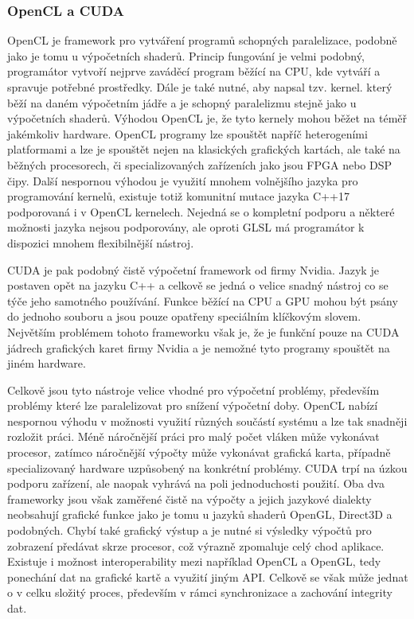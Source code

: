 \subsubsection{OpenCL a CUDA}
OpenCL je framework pro vytváření programů schopných paralelizace, podobně jako je tomu u výpočetních shaderů. Princip fungování je velmi podobný, programátor vytvoří nejprve zaváděcí program běžící na CPU, kde vytváří a spravuje potřebné prostředky. Dále je také nutné, aby napsal tzv. kernel. který běží na daném výpočetním jádře a je schopný paralelizmu stejně jako u výpočetních shaderů. Výhodou OpenCL je, že tyto kernely mohou běžet na téměř jakémkoliv hardware. OpenCL programy lze spouštět napříč heterogeními platformami a lze je spouštět nejen na klasických grafických kartách, ale také na běžných procesorech, či specializovaných zařízeních jako jsou FPGA nebo DSP čipy. Další nespornou výhodou je využití mnohem volnějšího jazyka pro programování kernelů, existuje totiž komunitní mutace jazyka C++17 podporovaná i v OpenCL kernelech. Nejedná se o kompletní podporu a některé možnosti jazyka nejsou podporovány, ale oproti GLSL má programátor k dispozici mnohem flexibilnější nástroj. 

CUDA je pak podobný čistě výpočetní framework od firmy Nvidia. Jazyk je postaven opět na jazyku C++ a celkově se jedná o velice snadný nástroj co se týče jeho samotného používání. Funkce běžící na CPU a GPU mohou být psány do jednoho souboru a jsou pouze opatřeny speciálním klíčkovým slovem. Největším problémem tohoto frameworku však je, že je funkční pouze na CUDA jádrech grafických karet firmy Nvidia a je nemožné tyto programy spouštět na jiném hardware.

Celkově jsou tyto nástroje velice vhodné pro výpočetní problémy, především problémy které lze paralelizovat pro snížení výpočetní doby. OpenCL nabízí nespornou výhodu v možnosti využití různých součástí systému a lze tak snadněji rozložit práci. Méně náročnější práci pro malý počet vláken může vykonávat procesor, zatímco náročnější výpočty může vykonávat grafická karta, případně specializovaný hardware uzpůsobený na konkrétní problémy. CUDA trpí na úzkou podporu zařízení, ale naopak vyhrává na poli jednoduchosti použití. Oba dva frameworky jsou však zaměřené čistě na výpočty a jejich jazykové dialekty neobsahují grafické funkce jako je tomu u jazyků shaderů OpenGL, Direct3D a podobných. Chybí také grafický výstup a je nutné si výsledky výpočtů pro zobrazení předávat skrze procesor, což výrazně zpomaluje celý chod aplikace. Existuje i možnost interoperability mezi například OpenCL a OpenGL, tedy ponechání dat na grafické kartě a využití jiným API. Celkově se však může jednat o v celku složitý proces, především v rámci synchronizace a zachování integrity dat.

